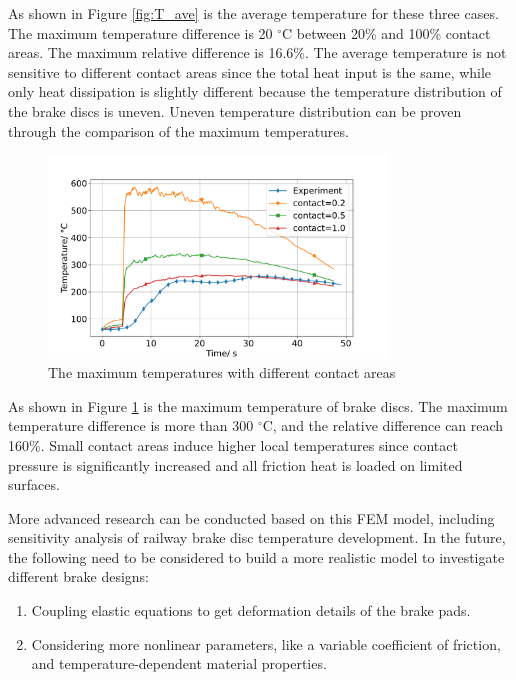 As shown in Figure \ref{fig:T_ave} is the average temperature for these three cases. The maximum temperature difference is 20 $^{\circ}\text{C}$ between 20\% and 100\% contact areas. The maximum relative difference is 16.6\%. The average temperature is not sensitive to different contact areas since the total heat input is the same, while only heat dissipation is slightly different because the temperature distribution of the brake discs is uneven. Uneven temperature distribution can be proven through the comparison of the maximum temperatures.

\begin{figure}[h]
    \centering
    \includegraphics[width=0.8\textwidth]{book/chapters/zhang/graphics/T_max_dc.pdf}
    \caption{The maximum temperatures with different contact areas}
    \label{fig:T_max}
\end{figure}

As shown in Figure \ref{fig:T_max} is the maximum temperature of brake discs. The maximum temperature difference is more than 300 $^{\circ}\text{C}$, and the relative difference can reach 160\%. Small contact areas induce higher local temperatures since contact pressure is significantly increased and all friction heat is loaded on limited surfaces.

More advanced research can be conducted based on this FEM model, including sensitivity analysis of railway brake disc temperature development. In the future, the following need to be considered to build a more realistic model to investigate different brake designs:

\begin{enumerate}
\item Coupling elastic equations to get deformation details of the brake pads.
\item Considering more nonlinear parameters, like a variable coefficient of friction, and temperature-dependent material properties.
\end{enumerate}


